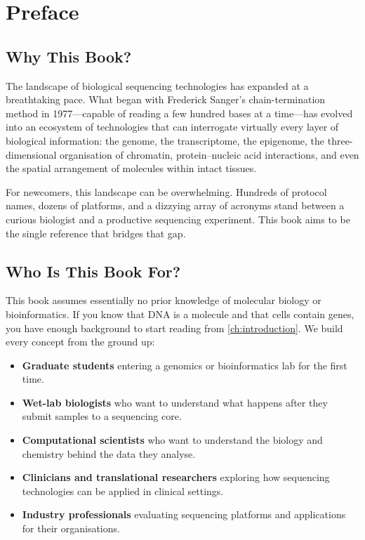 \chapter*{Preface}

\section*{Why This Book?}

The landscape of biological sequencing technologies has expanded at a breathtaking pace. What began with Frederick Sanger's chain-termination method in 1977---capable of reading a few hundred bases at a time---has evolved into an ecosystem of technologies that can interrogate virtually every layer of biological information: the genome, the transcriptome, the epigenome, the three-dimensional organisation of chromatin, protein--nucleic acid interactions, and even the spatial arrangement of molecules within intact tissues.

For newcomers, this landscape can be overwhelming. Hundreds of protocol names, dozens of platforms, and a dizzying array of acronyms stand between a curious biologist and a productive sequencing experiment. This book aims to be the single reference that bridges that gap.

\section*{Who Is This Book For?}

This book assumes essentially no prior knowledge of molecular biology or bioinformatics. If you know that DNA is a molecule and that cells contain genes, you have enough background to start reading from \cref{ch:introduction}. We build every concept from the ground up:

\begin{itemize}[nosep]
  \item \textbf{Graduate students} entering a genomics or bioinformatics lab for the first time.
  \item \textbf{Wet-lab biologists} who want to understand what happens after they submit samples to a sequencing core.
  \item \textbf{Computational scientists} who want to understand the biology and chemistry behind the data they analyse.
  \item \textbf{Clinicians and translational researchers} exploring how sequencing technologies can be applied in clinical settings.
  \item \textbf{Industry professionals} evaluating sequencing platforms and applications for their organisations.
\end{itemize}

